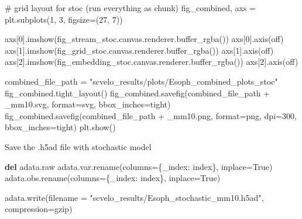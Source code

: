 \documentclass[
  letterpaper,
  DIV=11,
  numbers=noendperiod]{scrreprt}
\newenvironment{Shaded}{\begin{snugshade}}{\end{snugshade}}
\newcommand{\BuiltInTok}[1]{\textcolor[rgb]{0.00,0.23,0.31}{#1}}
\newcommand{\CommentTok}[1]{\textcolor[rgb]{0.37,0.37,0.37}{#1}}
\newcommand{\DecValTok}[1]{\textcolor[rgb]{0.68,0.00,0.00}{#1}}
\newcommand{\KeywordTok}[1]{\textcolor[rgb]{0.00,0.23,0.31}{\textbf{#1}}}
\newcommand{\NormalTok}[1]{\textcolor[rgb]{0.00,0.23,0.31}{#1}}
\newcommand{\OperatorTok}[1]{\textcolor[rgb]{0.37,0.37,0.37}{#1}}
\newcommand{\StringTok}[1]{\textcolor[rgb]{0.13,0.47,0.30}{#1}}
\newcommand{\VariableTok}[1]{\textcolor[rgb]{0.07,0.07,0.07}{#1}}
\begin{document}
\begin{Shaded}
\begin{Highlighting}[]
\CommentTok{\# grid layout for stoc (run everything as chunk)}
\NormalTok{fig\_combined, axs }\OperatorTok{=}\NormalTok{ plt.subplots(}\DecValTok{1}\NormalTok{, }\DecValTok{3}\NormalTok{, figsize}\OperatorTok{=}\NormalTok{(}\DecValTok{27}\NormalTok{, }\DecValTok{7}\NormalTok{))}

\NormalTok{axs[}\DecValTok{0}\NormalTok{].imshow(fig\_stream\_stoc.canvas.renderer.buffer\_rgba())}
\NormalTok{axs[}\DecValTok{0}\NormalTok{].axis(}\StringTok{\textquotesingle{}off\textquotesingle{}}\NormalTok{)}
\NormalTok{axs[}\DecValTok{1}\NormalTok{].imshow(fig\_grid\_stoc.canvas.renderer.buffer\_rgba())}
\NormalTok{axs[}\DecValTok{1}\NormalTok{].axis(}\StringTok{\textquotesingle{}off\textquotesingle{}}\NormalTok{)}
\NormalTok{axs[}\DecValTok{2}\NormalTok{].imshow(fig\_embedding\_stoc.canvas.renderer.buffer\_rgba())}
\NormalTok{axs[}\DecValTok{2}\NormalTok{].axis(}\StringTok{\textquotesingle{}off\textquotesingle{}}\NormalTok{) }

\NormalTok{combined\_file\_path }\OperatorTok{=} \StringTok{"scvelo\_results/plots/Esoph\_combined\_plots\_stoc"}
\NormalTok{fig\_combined.tight\_layout()}
\NormalTok{fig\_combined.savefig(combined\_file\_path }\OperatorTok{+} \StringTok{\textquotesingle{}\_mm10.svg\textquotesingle{}}\NormalTok{, }\BuiltInTok{format}\OperatorTok{=}\StringTok{\textquotesingle{}svg\textquotesingle{}}\NormalTok{, bbox\_inches}\OperatorTok{=}\StringTok{\textquotesingle{}tight\textquotesingle{}}\NormalTok{)}
\NormalTok{fig\_combined.savefig(combined\_file\_path }\OperatorTok{+} \StringTok{\textquotesingle{}\_mm10.png\textquotesingle{}}\NormalTok{, }\BuiltInTok{format}\OperatorTok{=}\StringTok{\textquotesingle{}png\textquotesingle{}}\NormalTok{, dpi}\OperatorTok{=}\DecValTok{300}\NormalTok{, bbox\_inches}\OperatorTok{=}\StringTok{\textquotesingle{}tight\textquotesingle{}}\NormalTok{)}
\NormalTok{plt.show()}
\end{Highlighting}
\end{Shaded}

Save the .h5ad file with stochastic model

\begin{Shaded}
\begin{Highlighting}[]
\KeywordTok{del}\NormalTok{ adata.raw}
\NormalTok{adata.var.rename(columns}\OperatorTok{=}\NormalTok{\{}\StringTok{\textquotesingle{}\_index\textquotesingle{}}\NormalTok{: }\StringTok{\textquotesingle{}index\textquotesingle{}}\NormalTok{\}, inplace}\OperatorTok{=}\VariableTok{True}\NormalTok{)}
\NormalTok{adata.obs.rename(columns}\OperatorTok{=}\NormalTok{\{}\StringTok{\textquotesingle{}\_index\textquotesingle{}}\NormalTok{: }\StringTok{\textquotesingle{}index\textquotesingle{}}\NormalTok{\}, inplace}\OperatorTok{=}\VariableTok{True}\NormalTok{)}

\NormalTok{adata.write(filename }\OperatorTok{=} \StringTok{"scvelo\_results/Esoph\_stochastic\_mm10.h5ad"}\NormalTok{, compression}\OperatorTok{=}\StringTok{\textquotesingle{}gzip\textquotesingle{}}\NormalTok{)}
\end{Highlighting}
\end{Shaded}
\end{document}
